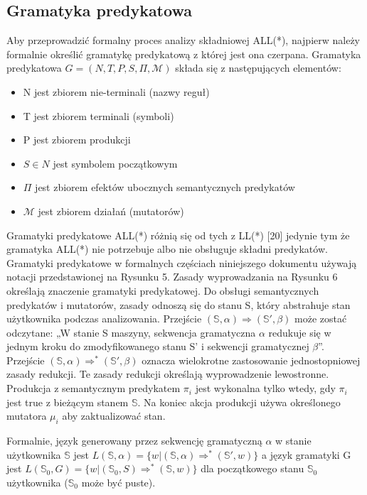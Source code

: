 \subsection{Gramatyka predykatowa}
Aby przeprowadzić formalny proces analizy składniowej ALL(*), najpierw należy formalnie
określić gramatykę predykatową z której jest ona czerpana.
Gramatyka predykatowa \(G = (N, T, P, S, \Pi, \mathcal{M})\) składa się z następujących elementów: 
\begin{itemize}
\item N jest zbiorem nie-terminali (nazwy reguł) 
\item T jest zbiorem terminali (symboli) 
\item P jest zbiorem produkcji 
\item \(S \in N\) jest symbolem początkowym 
\item \( \Pi \) jest zbiorem efektów ubocznych semantycznych predykatów
\item \(\mathcal{M}\) jest zbiorem działań (mutatorów) 
\end{itemize}
Gramatyki predykatowe ALL(*) różnią się od tych z LL(*) [20] jedynie tym że
gramatyka ALL(*) nie potrzebuje albo nie obsługuje składni predykatów.
Gramatyki predykatowe w formalnych częściach niniejszego dokumentu używają
notacji przedstawionej na Rysunku 5.
Zasady wyprowadzania na Rysunku 6 określają znaczenie gramatyki predykatowej.
Do obsługi semantycznych predykatów i mutatorów, zasady odnoszą się do stanu S,
który abstrahuje stan użytkownika podczas analizowania.
Przejście \(( \mathbb{S}, \alpha) \Rightarrow ( \mathbb{S'}, \beta) \)
może zostać odczytane: „W stanie S maszyny, sekwencja gramatyczna \(\alpha\)
redukuje się w jednym kroku do zmodyfikowanego stanu S' i sekwencji gramatycznej \(\beta\)”.
Przejście \((\mathbb{S}, \alpha) \Rightarrow^* (\mathbb{S'}, \beta)\)
oznacza wielokrotne zastosowanie jednostopniowej zasady redukcji.
Te zasady redukcji określają wyprowadzenie lewostronne.
Produkcja z semantycznym predykatem \(\pi_i\) jest wykonalna tylko wtedy,
gdy \(\pi_i\) jest true z bieżącym stanem \(\mathbb{S}\).
Na koniec akcja produkcji używa określonego mutatora \(\mu_i\) aby zaktualizować stan.
\par
Formalnie, język generowany przez sekwencję gramatyczną \(\alpha\)
w stanie użytkownika \(\mathbb{S}\)
jest \(L(\mathbb{S},\alpha) = \{w| (\mathbb{S},\alpha)\Rightarrow^*(\mathbb{S'},w)\} \)
a język gramatyki G jest \(L(\mathbb{S}_0,G) = \{w| (\mathbb{S}_0,S)\Rightarrow^*(\mathbb{S},w)\} \)
dla początkowego stanu \(\mathbb{S}_0\) użytkownika (\(\mathbb{S}_0\) może być puste).
